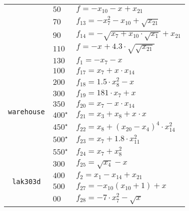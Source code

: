 \documentclass[letterpaper]{article} %
\begin{document}
\begin{table}[t!]
{\begin{tabular}{c|l|l}
            & $ 50 $ & $ f_{} = - x_{10}- x_{} + x_{21} $ \\
            & $ 70 $ & $ f_{13} = - x_{7}^2 - x_{10} + \sqrt{x_{21}} $ \\
            & $ 90 $ & $ f_{14} = - \sqrt{x_{7} + x_{10} \cdot \sqrt{x_{1}}} + x_{21} $ \\
            & $ 110 $ & $ f_{} = - x_{} + 4.3 \cdot \sqrt{\sqrt{x_{21}}} $ \\
            & $ 130 $ & $ f_{1} = - x_{7} - x_{} $ \\
            \hline
            \multirow{8}{*}{\begin{turn}{90} {\tt warehouse} \end{turn}}
            & $ 100 $ & $ f_{17} = x_{7} + x_{} \cdot x_{14} $ \\
            & $ 200 $ & $ f_{18} = 1.5 \cdot x_{8}^2 - x_{} $ \\
            & $ 300 $ & $ f_{19} = 181 \cdot x_{7} + x_{} $ \\
            & $ 350 $ & $ f_{20} = x_{7} - x_{} \cdot x_{14} $ \\
            & $ 400^\star $ & $ f_{21} = x_{3} + x_{8} + x_{} \cdot x_{} $ \\
            & $ 450^\star $ & $ f_{22} = x_{8} + \left(x_{20} - x_{4}\right)^4 \cdot x_{14}^2 $ \\
            & $ 500^\star $ & $ f_{23} = x_{7} + 1.8 \cdot x_{11}^2 $ \\
            & $ 550^\star $ & $ f_{24} = x_{7} + x_{8}^2 $ \\
            \hline
            \multirow{7}{*}{\begin{turn}{90} {\tt lak303d} \end{turn}}
            & $ 300 $ & $ f_{25} = \sqrt{x_{4}} - x_{} $ \\
            & $ 400 $ & $ f_{2} = x_{1} - x_{14} + x_{21} $ \\
            & $ 500 $ & $ f_{27} = - x_{10}(x_{10} + 1) + x_{} $ \\
            & $ 00 $ & $ f_{28} = - 7 \cdot x_{7}^2 - \sqrt{x_{}} $ \\

\end{tabular}}
\end{table}
\end{document}
